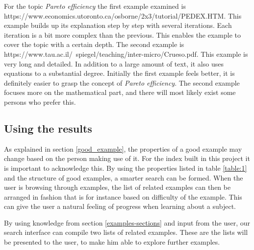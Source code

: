 For the topic \textit{Pareto efficiency} the first example examined is\\ https://www.economics.utoronto.ca/osborne/2x3/tutorial/PEDEX.HTM. This example builds up its explanation step by step with several iterations. Each iteration is a bit more complex than the previous. This enables the example to cover the topic with a certain depth. The second example is https://www.tau.ac.il/~spiegel/teaching/inter-micro/Crueso.pdf. This example is very long and detailed. In addition to a large amount of text, it also uses equations to a substantial degree. Initially the first example feels better, it is definitely easier to grasp the concept of \textit{Pareto efficiency}. The second example focuses more on the mathematical part, and there will most likely exist some persons who prefer this. 

\subsection{Using the results}

As explained in section \ref{good_example}, the properties of a good example may change based on the person making use of it. For the index built in this project it is important to acknowledge this. By using the properties listed in table \ref{table:1} and the structure of good examples, a smarter search can be formed. When the user is browsing through examples, the list of related examples can then be arranged in fashion that is for instance based on difficulty of the example. This can give the user a natural feeling of progress when learning about a subject.

By using knowledge from section \ref{examples-sections} and input from the user, our search interface can compile two lists of related examples. These are the lists will be presented to the user, to make him able to explore further examples. 



\cleardoublepage